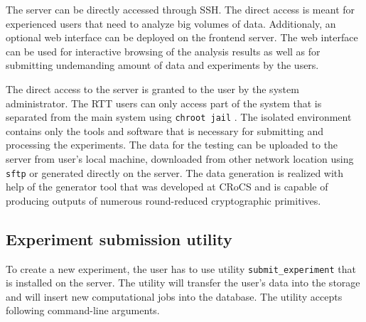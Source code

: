 \documentclass[
	digital,    %
	oneside,    %
	color,
	11pt,
	nocover,
	notable,
	nolof,
	nolot,
]{fithesis3}
\theoremstyle{definition}
\theoremstyle{remark}
\begin{document}
The server can be directly accessed through SSH. The direct access is meant for experienced users that need to analyze big volumes of data. Additionaly, an optional web interface can be deployed on the frontend server. The web interface can be used for interactive browsing of the analysis results as well as for submitting undemanding amount of data and experiments by the users.

The direct access to the server is granted to the user by the system administrator. The RTT users can only access part of the system that is separated from the main system using \texttt{chroot jail} \cite{chroot}. The isolated environment contains only the tools and software that is necessary for submitting and processing the experiments. The data for the testing can be uploaded to the server from user's local machine, downloaded from other network location using \texttt{sftp} or generated directly on the server. The data generation is realized with help of the generator tool \cite{eacirc-streams} that was developed at CRoCS and is capable of producing outputs of numerous round-reduced cryptographic primitives.

\subsection*{Experiment submission utility}

To create a new experiment, the user has to use utility \texttt{submit\_experiment} that is installed on the server. The utility will transfer the user's data into the storage and will insert new computational jobs into the database. The utility accepts following command-line arguments.
\end{document}
